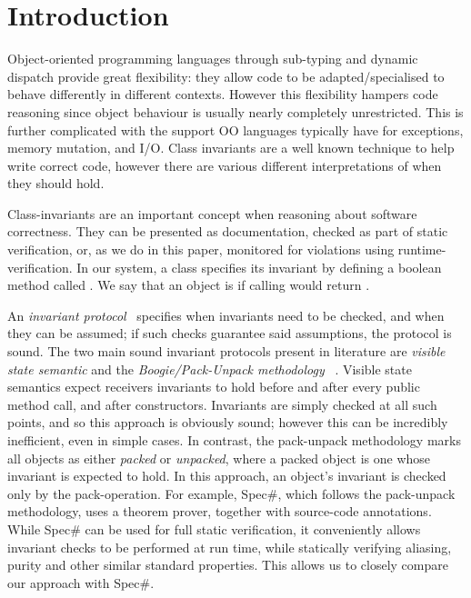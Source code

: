 \section{Introduction}
\label{s:intro}

Object-oriented programming languages through sub-typing and dynamic dispatch provide great flexibility: they
allow code to be adapted/specialised to behave differently in different contexts.
However this flexibility hampers code reasoning since object behaviour is usually nearly completely
unrestricted. This is further complicated with the support OO languages typically have for exceptions,
memory mutation, and I/O.
Class invariants are a well known technique to help write correct code, however
there are various different interpretations of when they should hold.


Class-invariants are an important concept when reasoning about software correctness.
They can be presented as documentation, checked as part of static verification, or, as we do in this paper, monitored for violations using runtime-verification.
In our system, a class specifies its invariant by defining a boolean method called \Q@invariant@. We say that an object is  if calling \Q@invariant@ would return \Q@true@.

An \emph{invariant protocol}~\cite{FlexibleInvariants} specifies when invariants need to be checked, and when they can be assumed; if such checks guarantee said assumptions, the protocol is sound.
The two main sound invariant protocols present in literature are \emph{visible state semantic} \cite{Meyer:1988:OSC:534929} and the \emph{Boogie/Pack-Unpack methodology} ~\cite{DBLP:journals/jot/BarnettDFLS04}. Visible state semantics expect receivers invariants to hold before and after every public method call, and after constructors. Invariants are simply checked at all such points, and so this approach is obviously sound; however this can be incredibly inefficient, even in simple cases.
In contrast, the pack-unpack methodology marks all objects as either \emph{packed} or \emph{unpacked}, where a packed object is one whose invariant is expected to hold.
In this approach, an object's invariant is checked only by the pack-operation.
 For example, Spec\#, which follows the pack-unpack methodology, uses a theorem prover, together with source-code annotations.
While Spec\# can be used for full static verification, it conveniently allows invariant checks to be performed
at run time, while statically verifying aliasing, purity and other similar standard properties.
This allows us to closely compare our approach with Spec\#.

